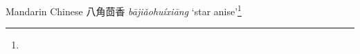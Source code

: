 \begin{etymology}\label{ety:bajiaohuixiang}
Mandarin Chinese {八角茴香} \textit{bājiǎohuíxiāng} `star anise'\footnote{}
\end{etymology}